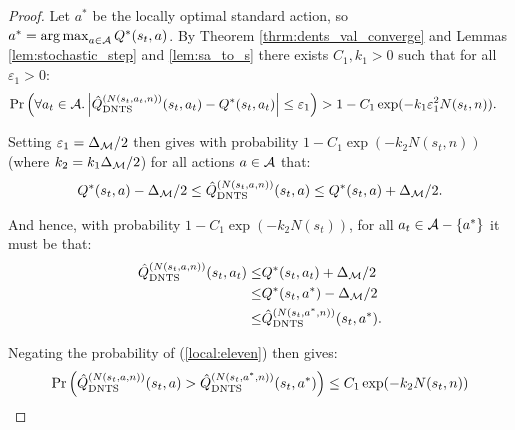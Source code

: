         \begin{proof}
            Let $a^*$ be the locally optimal standard action, so $a^*=\operatorname*{arg\,max}_{a\in\mathcal{A}} Q^*(s_t,a)$. By Theorem \ref{thrm:dents_val_converge} and Lemmas \ref{lem:stochastic_step} and \ref{lem:sa_to_s} there exists $C_1,k_1>0$ such that for all $\varepsilon_1>0$:
            \begin{align}
                \Pr\left(\forall a_t\in\mathcal{A}. \left|{\hat{Q}^{(N(s_t,a_t,n))}_{{\textnormal{DNTS}}}}(s_t,a_t)-Q^*(s_t,a_t)\right|\leq \varepsilon_1\right) &> 1-C_1 \exp(-k_1 \varepsilon_1^2 N(s_t,n)).
            \end{align}
            
            Setting $\varepsilon_1=\Delta_{\mathcal{M}}/2$ then gives with probability $1-C_1 \exp(-k_2N(s_t,n))$ (where $k_2=k_1\Delta_{\mathcal{M}}/2$) for all actions $a\in\mathcal{A}$ that:
            \begin{align}
                Q^*(s_t,a) - \Delta_{\mathcal{M}}/2 \leq {\hat{Q}^{(N(s_t,a,n))}_{{\textnormal{DNTS}}}}(s_t,a) \leq Q^*(s_t,a) + \Delta_{\mathcal{M}}/2.
            \end{align}
            
            And hence, with probability $1-C_1 \exp(-k_2N(s_t))$, for all $a_t\in\mathcal{A}-\{a^*\}$ it must be that:
            \begin{align}
                {\hat{Q}^{(N(s_t,a,n))}_{{\textnormal{DNTS}}}}(s_t,a_t)
                    \leq& Q^*(s_t,a_t) + \Delta_{\mathcal{M}}/2 \\
                    \leq& Q^*(s_t,a^*) - \Delta_{\mathcal{M}}/2 \\
                    \leq& {\hat{Q}^{(N(s_t,a^*,n))}_{{\textnormal{DNTS}}}}(s_t,a^*). \label{local:eleven}
            \end{align}
            
            Negating the probability of (\ref{local:eleven}) then gives:
            \begin{align}
                \Pr\left({\hat{Q}^{(N(s_t,a,n))}_{{\textnormal{DNTS}}}}(s_t,a) > {\hat{Q}^{(N(s_t,a^*,n))}_{{\textnormal{DNTS}}}}(s_t,a^*)\right) \leq C_1 \exp(-k_2N(s_t,n))
            \end{align}
            

\end{proof}
